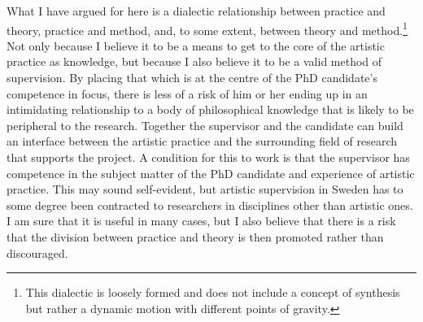 \documentclass[12pt]{article}
\begin{document}

What I have argued for here is a dialectic relationship between practice and theory, practice and method, and, to some extent, between theory and method.\footnote{This dialectic is loosely formed and does not include a concept of synthesis but rather a dynamic motion with different points of gravity.} Not only because I believe it to be a means to get to the core of the artistic practice as knowledge, but because I also believe it to be a valid method of supervision. By placing that which is at the centre of the PhD candidate's competence in focus, there is less of a risk of him or her ending up in an intimidating relationship to a body of philosophical knowledge that is likely to be peripheral to the research. Together the supervisor and the candidate can build an interface between the artistic practice and the surrounding field of research that supports the project. A condition for this to work is that the supervisor has competence in the subject matter of the PhD candidate and experience of artistic practice. This may sound self-evident, but artistic supervision in Sweden has to some degree been contracted to researchers in disciplines other than artistic ones. I am sure that it is useful in many cases, but I also believe that there is a risk that the division between practice and theory is then promoted rather than discouraged.
\end{document}
